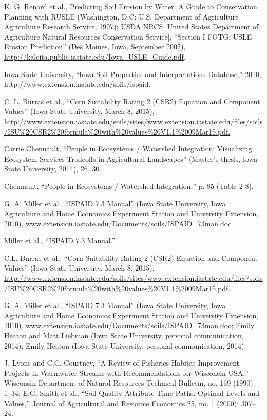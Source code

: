 \documentclass[11pt]{article}
\begin{document}
\begin{itemize}
\begin{thebibliography}{1}
   K. G. Renard et al., Predicting Soil Erosion by Water: A Guide to Conservation Planning with RUSLE (Washington, D.C: U.S. Department of Agriculture Agriculture Research Service, 1997); USDA NRCS [United States Department of Agriculture Natural Resources Conservation Service], “Section I FOTG: USLE Erosion Prediction” (Des Moines, Iowa, September 2002), \url{http://kaleita.public.iastate.edu/Iowa_USLE_Guide.pdf}.
  
  Iowa State University, “Iowa Soil Properties and Interpretations Database,” 2010, http://www.extension.iastate.edu/soils/ispaid.
  
  C. L. Burras et al., “Corn Suitability Rating 2 (CSR2) Equation and Component Values” (Iowa State University, March 8, 2015), \url{http://www.extension.iastate.edu/soils/sites/www.extension.iastate.edu/files/soils/ISU\%20CSR2\%20formula\%20with\%20values\%20V1.1\%2009Mar15.pdf.}
  
  Carrie Chennault, “People in Ecosystems / Watershed Integration: Visualizing Ecosystem Services Tradeoffs in Agricultural Landscapes” (Master’s thesis, Iowa State University, 2014), 26, 30.
  
  Chennault, “People in Ecosystems / Watershed Integration,” p. 85 (Table 2-8).
  
  G. A. Miller et al., “ISPAID 7.3 Manual” (Iowa State University, Iowa Agriculture and Home Economics Experiment Station and University Extension, 2010), \url{www.extension.iastate.edu/Documents/soils/ISPAID_73man.doc}
  
  Miller et al., “ISPAID 7.3 Manual.”
  
  C.L. Burras et al., “Corn Suitability Rating 2 (CSR2) Equation and Component Values” (Iowa State University, March 8, 2015), \url{http://www.extension.iastate.edu/soils/sites/www.extension.iastate.edu/files/soils/ISU\%20CSR2\%20formula\%20with\%20values\%20V1.1\%2009Mar15.pdf.}
  
   G. A. Miller et al., “ISPAID 7.3 Manual” (Iowa State University, Iowa Agriculture and Home Economics Experiment Station and University Extension, 2010), \url{www.extension.iastate.edu/Documents/soils/ISPAID_73man.doc}; Emily Heaton and Matt Liebman (Iowa State University, personal communication, 2014); Emily Heaton (Iowa State University, personal communication, 2014).
  
    J. Lyons and C.C. Courtney, “A Review of Fisheries Habitat Improvement Projects in Warmwater Streams with Recommendations for Wisconsin USA,” Wisconsin Department of Natural Resources Technical Bulletin, no. 169 (1990): 1–34; E.G. Smith et al., “Soil Quality Attribute Time Paths: Optimal Levels and Values,” Journal of Agricultural and Resource Economics 25, no. 1 (2000): 307–24.
 

\end{thebibliography}
\end{itemize}
\end{document}

